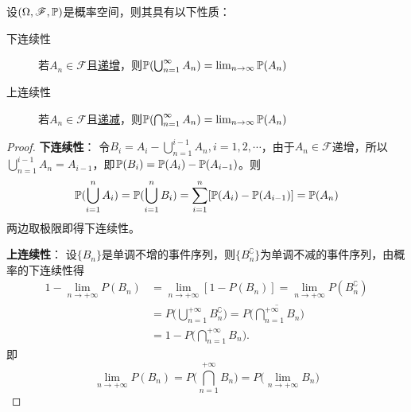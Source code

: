 \begin{proposition}[概率的连续性质]
    设$(\Omega,\mathscr{F},\P)$是概率空间，则其具有以下性质：
    \begin{description}
        \item[下连续性] 若$A_n \in \mathscr{F}$且\underline{递增}，则$\P(\bigcup_{n=1}^{\infty}A_{n}) =  \lim_{n\to \infty}\P(A_{n})$
        \item[上连续性] 若$A_n \in \mathscr{F}$且\underline{递减}，则$\P(\bigcap_{n=1}^{\infty}A_{n}) =  \lim_{n\to \infty}\P(A_{n})$
    \end{description}
\end{proposition}
\begin{proof}

    \textbf{下连续性}： 令$B_i=A_i-\bigcup_{n=1}^{i-1}A_{n}, i=1,2,\cdots$，由于$A_n \in \mathscr{F}$递增，所以$\bigcup_{n=1}^{i-1}A_{n}=A_{i-1}$，即$\P(B_i)=\P(A_i)-\P(A_{i-1})$。则
    \[ \P(\bigcup_{i=1}^n A_i)=\P(\bigcup_{i=1}^n B_i) = \sum_{i=1}^n [\P(A_i)-\P(A_{i-1})]=\P(A_n) \]
    两边取极限即得下连续性。

    \textbf{上连续性}： 设$\{ B_n \}$是单调不增的事件序列，则$\{ B_n^{\complement} \}$为单调不减的事件序列，由概率的下连续性得
    \begin{align*}
        1 - \lim_{n \to +\infty} P(B_n)
         & = \lim_{n \to +\infty} [1 - P(B_n)] = \lim_{n \to +\infty} P(B_n^{\complement})                                          \\
         & = P \biggl( \bigcup_{n=1}^{+\infty} B_n^{\complement} \biggr) = P \biggl( \overline{\bigcap_{n=1}^{+\infty} B_n} \biggr) \\
         & = 1 - P \biggl( \bigcap_{n=1}^{+\infty} B_n \biggr).
    \end{align*}
    即
    \[ \lim_{n \to +\infty} P(B_n) = P \biggl( \bigcap_{n=1}^{+\infty} B_n \biggr) = P \biggl(\lim_{n \to +\infty} B_n \biggr) \]
\end{proof}




